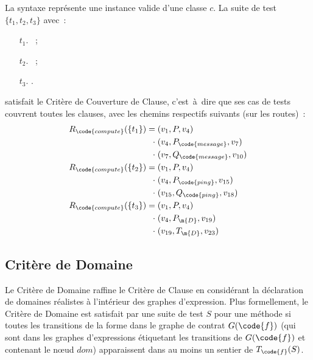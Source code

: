 \begin{example}

La syntaxe  représente une instance valide d'une classe $c$.
La suite de test $\{t_1, t_2, t_3\}$ avec~:
%
\begin{itemize}

\item[$t_1.$]
%
~;

\item[$t_2.$]
%
~;

\item[$t_3.$]
%
.

\end{itemize}
%
satisfait le Critère de Couverture de Clause, c'est~à~dire que ses cas de tests
couvrent toutes les clauses, avec les chemins respectifs suivants (sur les
routes)~:
%
\begin{align*}
%
R_\code{compute}(\{t_1\}) =\;
          & (v_1, P, v_4) \\
  \cdot\; & (v_4, P_\code{message}, v_7) \\
  \cdot\; & (v_7, Q_\code{message}, v_{10}) \\
%
R_\code{compute}(\{t_2\}) =\;
          & (v_1, P, v_4) \\
  \cdot\; & (v_4, P_\code{ping}, v_{15}) \\
  \cdot\; & (v_{15}, Q_\code{ping}, v_{18}) \\
%
R_\code{compute}(\{t_3\}) =\;
          & (v_1, P, v_4) \\
  \cdot\; & (v_4, P_\m{D}, v_{19}) \\
  \cdot\; & (v_{19}, T_\m{D}, v_{23})
%
\end{align*}

\end{example}

\subsection{Critère de Domaine}

Le Critère de Domaine raffine le Critère de Clause en considérant la déclaration
de domaines réalistes à l'intérieur des graphes d'expression. Plus formellement,
le Critère de Domaine est satisfait par une suite de test $S$ pour une méthode
 si toutes les transitions de la forme  dans le graphe de
contrat $G(\code{f})$ (qui sont dans les graphes d'expressions étiquetant les
transitions de $G(\code{f})$ et contenant le nœud $\mathit{dom}$) apparaissent
dans au moins un sentier de $T_\code{f}(S)$.


